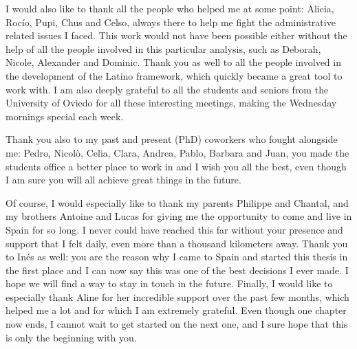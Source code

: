 \documentclass[a4paper, 10pt, openright]{report}
\begin{document}
I would also like to thank all the people who helped me at some point: Alicia, Roc\'{i}o, Pupi, Chus and Celso, always there to help me fight the administrative related issues I faced. This work would not have been possible either without the help of all the people involved in this particular analysis, such as Deborah, Nicole, Alexander and Dominic. Thank you as well to all the people involved in the development of the Latino framework, which quickly became a great tool to work with. I am also deeply grateful to all the students and seniors from the University of Oviedo for all these interesting meetings, making the Wednesday mornings special each week. 

Thank you also to my past and present (PhD) coworkers who fought alongside me: Pedro, Nicol\`{o}, Celia, Clara, Andrea, Pablo, Barbara and Juan, you made the students office a better place to work in and I wish you all the best, even though I am sure you will all achieve great things in the future.

Of course, I would especially like to thank my parents Philippe and Chantal, and my brothers Antoine and Lucas for giving me the opportunity to come and live in Spain for so long. I never could have reached this far without your presence and support that I felt daily, even more than a thousand kilometers away. Thank you to In\'{e}s as well: you are the reason why I came to Spain and started this thesis in the first place and I can now say this was one of the best decisions I ever made. I hope we will find a way to stay in touch in the future. Finally, I would like to especially thank Aline for her incredible support over the past few months, which helped me a lot and for which I am extremely grateful. Even though one chapter now ends, I cannot wait to get started on the next one, and I sure hope that this is only the beginning with you.

\newpage

%
\end{document}
